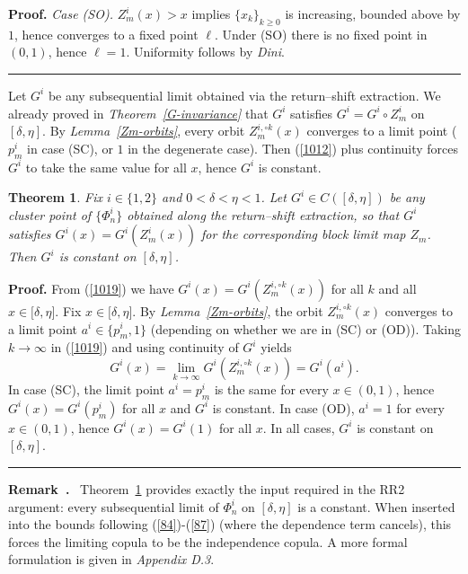 \documentclass[onecolumn]{article}
\newtheorem{theorem}{Theorem}
\newenvironment{remark}{  \refstepcounter{theorem}  \par\medskip\noindent\textbf{Remark~\thetheorem.}\rmfamily\ }{\par\medskip}
\newenvironment{proof}[1][Proof]{\noindent\textbf{#1.} }{\ \rule{0.5em}{0.5em}}
\begin{document}
\begin{proof}
\smallskip \noindent \emph{Case (SO).} $Z_{m}^{i}(x)>x$ implies $%
\{x_{k}\}_{k\geq 0}$ is increasing, bounded above by $1$, hence converges to
a fixed point $\ell $. Under (SO) there is no fixed point in $(0,1)$, hence $%
\ell =1$. Uniformity follows by \textit{Dini}. \hfill
\end{proof}

Let $G^{i}$ be any subsequential limit obtained via the return--shift
extraction. We already proved in \textit{Theorem~\ref{G-invariance}} that $%
G^{i}$ satisfies $G^{i}=G^{i}\circ Z_{m}^{i}$ on $[\delta ,\eta ]$. By 
\textit{Lemma~\ref{Zm-orbits}}, every orbit $Z_{m}^{i,\circ k}(x)$ converges
to a limit point ($p_{m}^{i}$ in case (SC), or $1$ in the degenerate case).
Then (\ref{1012}) plus continuity forces $G^{i}$ to take the same value for
all $x$, hence $G^{i}$ is constant.

\begin{theorem}
\label{Phi-cluster-constant} Fix $i\in \{1,2\}$ and $0<\delta <\eta <1$. Let 
$G^{i}\in C([\delta ,\eta ])$ be any cluster point of $\{\Phi _{n}^{i}\}$
obtained along the return--shift extraction, so that $G^{i}$ satisfies $%
G^{i}(x)=G^{i}(Z_{m}^{i}(x))$ for the corresponding block limit map $Z_{m}$.
Then $G^{i}$ is constant on $[\delta ,\eta ]$.
\end{theorem}

\begin{proof}
From (\ref{1019}) we have $G^{i}(x)=G^{i}(Z_{m}^{i,\circ k}(x))$ for all $k$
and all $x\in \lbrack \delta ,\eta ]$. Fix $x\in \lbrack \delta ,\eta ]$. By 
\textit{Lemma~\ref{Zm-orbits}}, the orbit $Z_{m}^{i,\circ k}(x)$ converges
to a limit point $a^{i}\in \{p_{m}^{i},1\}$ (depending on whether we are in
(SC) or (OD)). Taking $k\rightarrow \infty $ in (\ref{1019}) and using
continuity of $G^{i}$ yields 
\begin{equation}
G^{i}(x)=\lim_{k\rightarrow \infty }G^{i}(Z_{m}^{i,\circ k}(x))=G^{i}(a^{i}).
\label{1026}
\end{equation}%
In case (SC), the limit point $a^{i}=p_{m}^{i}$ is the same for every $x\in
(0,1)$, hence $G^{i}(x)=G^{i}(p_{m}^{i})$ for all $x$ and $G^{i}$ is
constant. In case (OD), $a^{i}=1$ for every $x\in (0,1)$, hence $%
G^{i}(x)=G^{i}(1)$ for all $x$. In all cases, $G^{i}$ is constant on $%
[\delta ,\eta ]$. \hfill
\end{proof}

\begin{remark}
\label{convergence} Theorem~\ref{Phi-cluster-constant} provides exactly the
input required in the RR2 argument: every subsequential limit of $\Phi
_{n}^{i}$ on $[\delta ,\eta ]$ is a constant. When inserted into the bounds
following (\ref{84})-(\ref{87}) (where the dependence term cancels), this
forces the limiting copula to be the independence copula. A more formal
formulation is given in \textit{Appendix D.3}.
\end{remark}
\end{document}
